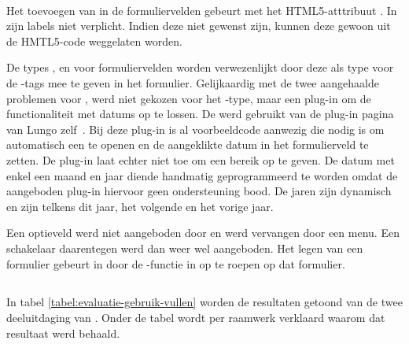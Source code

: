 \paragraph{\lungo} 
Het toevoegen van  in de formuliervelden gebeurt met het HTML5-atttribuut .
In \lungo{} zijn labels niet verplicht.
Indien deze niet gewenst zijn, kunnen deze gewoon uit de HMTL5-code weggelaten worden.

De types ,  en  voor formuliervelden worden verwezenlijkt door deze als type voor de -tags mee te geven in het formulier.
Gelijkaardig met de twee aangehaalde problemen voor \jqm{}, werd niet gekozen voor het -type, maar een plug-in om de functionaliteit met datums op te lossen.
De  werd gebruikt van de plug-in pagina van Lungo zelf~\cite{TapQuo2013b}.
Bij deze plug-in is al voorbeeldcode aanwezig die nodig is om automatisch een  te openen en de aangeklikte datum in het formulierveld te zetten.
De plug-in laat echter niet toe om een bereik op te geven.
De datum met enkel een maand en jaar diende handmatig geprogrammeerd te worden omdat de aangeboden plug-in hiervoor geen ondersteuning bood.
De jaren zijn dynamisch en zijn telkens dit jaar, het volgende en het vorige jaar. 

Een optieveld werd niet aangeboden door \lungo{} en werd vervangen door een menu. 
Een schakelaar daarentegen werd dan weer wel aangeboden.
Het legen van een formulier gebeurt in \lungo{} door de -functie in \js{} op te roepen op dat formulier.


\subsection{}
\label{sec:evaluatie-gebruik-vullen}

In tabel \ref{tabel:evaluatie-gebruik-vullen} worden de resultaten getoond van de twee deeluitdaging van .
Onder de tabel wordt per raamwerk verklaard waarom dat resultaat werd behaald.

